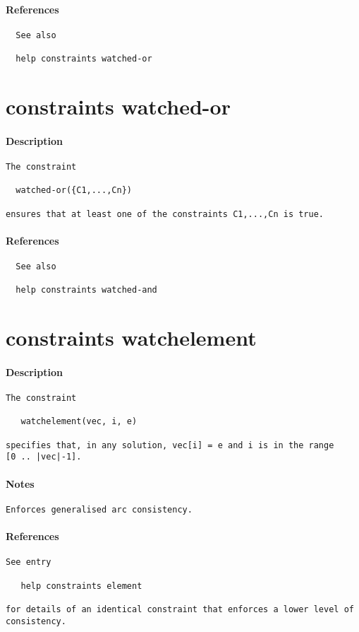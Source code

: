 \paragraph{References}
{\footnotesize
\begin{verbatim}
  See also

  help constraints watched-or
\end{verbatim}
}
\section{constraints watched-or}
\paragraph{Description}
{\footnotesize
\begin{verbatim}
The constraint

  watched-or({C1,...,Cn})

ensures that at least one of the constraints C1,...,Cn is true.
\end{verbatim}
}
\paragraph{References}
{\footnotesize
\begin{verbatim}
  See also

  help constraints watched-and
\end{verbatim}
}
\section{constraints watchelement}
\paragraph{Description}
{\footnotesize
\begin{verbatim}
The constraint

   watchelement(vec, i, e)

specifies that, in any solution, vec[i] = e and i is in the range
[0 .. |vec|-1].
\end{verbatim}
}
\paragraph{Notes}
{\footnotesize
\begin{verbatim}
Enforces generalised arc consistency.
\end{verbatim}
}
\paragraph{References}
{\footnotesize
\begin{verbatim}
See entry

   help constraints element

for details of an identical constraint that enforces a lower level of
consistency.
\end{verbatim}
}
